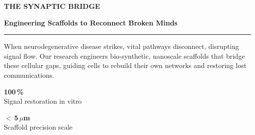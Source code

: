 \documentclass[aspectratio=169,11pt]{beamer}
\begin{document}
\noindent{}
\vspace{0.8em}



\begin{frame}[plain]
  \vfill
  \noindent
  \begin{minipage}[c][0.85\textheight][c]{0.46\textwidth}
    \raggedright
    {\fontsize{28}{34}\selectfont \bfseries \color{textwhite} THE SYNAPTIC BRIDGE \par}
    \vspace{0.2cm}
    {\fontsize{13}{16}\selectfont \bfseries \color{cyanaccent} Engineering Scaffolds to Reconnect Broken Minds \par}
    
    \vspace{0.3cm}
    {\color{gold}\hrule height 2pt width 50pt}
    \vspace{0.5cm}
    
    \begin{tcolorbox}[
      colback=bgdark,
      colframe=gold,
      sharp corners,
      leftrule=3pt,
      rightrule=0pt,
      toprule=0pt,
      bottomrule=0pt,
      left=12pt,
      right=0pt,
      top=6pt,
      bottom=6pt,
      boxsep=0pt
    ]
      {\fontsize{10.5}{15}\selectfont \color{textwhite}
      When neurodegenerative disease strikes, vital pathways disconnect, disrupting signal flow. Our research engineers bio-synthetic, nanoscale scaffolds that bridge these cellular gaps, guiding cells to rebuild their own networks and restoring lost communications. \par}
    \end{tcolorbox}
    
    \vspace{0.6cm}
    \begin{minipage}[t]{0.45\textwidth}
      {\fontsize{24}{28}\selectfont \bfseries \color{gold} 100\,\%} \\{}
      {\fontsize{9}{11}\selectfont \color{mutedgray} Signal restoration in vitro}
    \end{minipage}%
    \hfill
    \begin{minipage}[t]{0.45\textwidth}
      {\fontsize{24}{28}\selectfont \bfseries \color{cyanaccent} $<$\,5\,$\mu$m} \\{}
      {\fontsize{9}{11}\selectfont \color{mutedgray} Scaffold precision scale}
    \end{minipage}
    

\end{minipage}
\end{frame}
\end{document}
